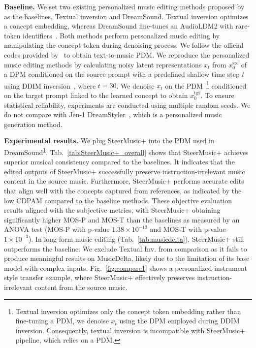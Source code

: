 \textbf{Baseline.} We set two existing personalized music editing methods proposed by~\citet{plitsis2024investigating} as the baselines, Textual inversion and DreamSound. Textual inversion optimizes a concept embedding, whereas DreamSound fine-tunes an AudioLDM2 with rare-token identifiers~\cite{ruiz2023dreambooth}.
Both methods perform personalized music editing by manipulating the concept token during denoising process.
We follow the official codes provided by~\citet{plitsis2024investigating} to obtain text-to-music PDM. We reproduce the personalized music editing methods by calculating noisy latent representations $x_t$ from $x_0^{\text{src}}$ of a DPM conditioned on the source prompt with a predefined shallow time step $t$ using DDIM inversion~\cite{song2020denoising}, where $t=30$. We denoise $x_t$ on the PDM~\footnote{\label{foot:textinv} Textual inversion optimizes only the concept token embedding rather than fine-tuning a PDM, we denoise $x_t$ using the DPM employed during DDIM inversion. Consequently, textual inversion is incompatible with SteerMusic+ pipeline, which relies on a PDM.} conditioned on the target prompt linked to the learned concept to obtain $x_0^{\text{tgt}}$. To ensure statistical reliability, experiments are conducted using multiple random seeds. We do not compare with Jen-1 DreamStyler~\cite{chen2024jen}, which is a personalized music generation method.

\textbf{Experimental results.}
We plug SteerMusic+ into the PDM used in DreamSound\textsuperscript{\ref{foot:textinv}}.
Tab.~\ref{tab:SteerMusic+_overall}
shows that SteerMusic+ achieves superior musical consistency compared to the baselines. It indicates that the edited outputs of SteerMusic+ successfully preserve instruction-irrelevant music content in the source music. Furthermore, SteerMusic+ performs accurate edits that align well with the concepts captured from references, as indicated by the low CDPAM compared to the baseline methods. These objective evaluation results aligned with the subjective metrics, with SteerMusic+ obtaining significantly higher MOS-P and MOS-T than the baselines as measured by an ANOVA test (MOS-P with p-value $1.38\times 10^{-13}$ and MOS-T with p-value $1 \times 10^{-3}$).
In long-form music editing (Tab.~\ref{tab:musicdelta}), SteerMusic+ still outperforms the baseline. We exclude Textual Inv. from comparison as it fails to produce meaningful results on MusicDelta, likely due to the limitation of its base model with complex inputs.
Fig.~\ref{fig:compare1} shows a personalized instrument style transfer example, where SteerMusic+ effectively preserves instruction-irrelevant content from the source music.


